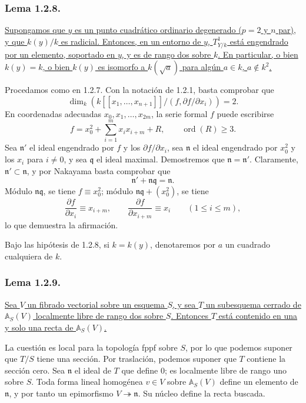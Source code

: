 \subsubsection*{Lema 1.2.8.}
\underline{Supongamos que $y$ es un punto cuadrático ordinario
degenerado ($p=2$ y $n$ par), y que $k(y)/k$ es radicial. Entonces, en
un entorno de $y$, $T^1_{Y/k}$ está engendrado por un elemento,
soportado en $y$, y es de rango dos sobre $k$. En particular, o bien
$k(y)=k$, o bien $k(y)$ es isomorfo a $k(\sqrt a)$ para algún
$a\in k$, $a\notin k^2$.}

Procedamos como en 1.2.7. Con la notación de 1.2.1, basta comprobar que
\[
\dim_k\left(
k[[x_1,\ldots,x_{n+1}]]\big/
  (f,\partial f/\partial x_i)
\right)=2.
\]
En coordenadas adecuadas $x_0,x_1,\ldots,x_{2m}$, la serie formal $f$
puede escribirse
\[
f=x_0^2+\sum_{i=1}^m x_ix_{i+m}+R,
\qquad\operatorname{ord}(R)\geq3.
\]
Sea $\mathfrak n'$ el ideal engendrado por $f$ y los
$\partial f/\partial x_i$, sea $\mathfrak n$ el ideal engendrado por
$x_0^2$ y los $x_i$ para $i\ne0$, y sea $\mathfrak q$ el ideal
maximal. Demostremos que $\mathfrak n=\mathfrak n'$. Claramente,
$\mathfrak n'\subset\mathfrak n$, y por Nakayama basta comprobar que
\[
\mathfrak n'+\mathfrak n\mathfrak q=\mathfrak n.
\]
Módulo $\mathfrak n\mathfrak q$, se tiene $f\equiv x_0^2$; módulo
$\mathfrak n\mathfrak q+(x_0^2)$, se tiene
\[
\frac{\partial f}{\partial x_i}\equiv x_{i+m},
\qquad
\frac{\partial f}{\partial x_{i+m}}\equiv x_i
\qquad(1\leq i\leq m),
\]
lo que demuestra la afirmación.

Bajo las hipótesis de 1.2.8, si $k=k(y)$, denotaremos por $a$ un
cuadrado cualquiera de $k$.

\pageoriginale

\subsubsection*{Lema 1.2.9.}
\underline{Sea $V$ un fibrado vectorial sobre un esquema $S$, y sea
$T$ un subesquema cerrado de $\mathbb A_S(V)$ localmente libre de
rango dos sobre $S$. Entonces $T$ está contenido en una y solo una
recta de $\mathbb A_S(V)$.}

La cuestión es local para la topología fppf sobre $S$, por lo que
podemos suponer que $T/S$ tiene una sección. Por traslación, podemos
suponer que $T$ contiene la sección cero. Sea $\mathfrak n$ el ideal
de $T$ que define $0$; es localmente libre de rango uno sobre $S$.
Toda forma lineal homogénea $v\in V$ sobre $\mathbb A_S(V)$ define un
elemento de $\mathfrak n$, y por tanto un epimorfismo
$V\twoheadrightarrow\mathfrak n$. Su núcleo define la recta buscada.

